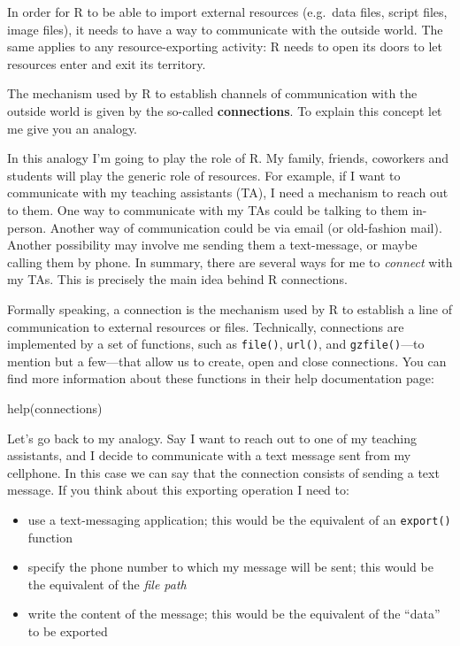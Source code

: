 \documentclass[
]{book}
\newenvironment{Shaded}{\begin{snugshade}}{\end{snugshade}}
\newcommand{\FunctionTok}[1]{\textcolor[rgb]{0.00,0.00,0.00}{#1}}
\newcommand{\NormalTok}[1]{#1}
\begin{document}
In order for R to be able to import external resources (e.g.~data files,
script files, image files), it needs to have a way to communicate with the
outside world. The same applies to any resource-exporting activity: R
needs to open its doors to let resources enter and exit its territory.

The mechanism used by R to establish channels of communication with the
outside world is given by the so-called \textbf{connections}. To explain this
concept let me give you an analogy.

In this analogy I'm going to play the role of R. My family, friends, coworkers
and students will play the generic role of resources. For example, if I want to
communicate with my teaching assistants (TA), I need a mechanism to reach
out to them. One way to communicate with my TAs could be talking to them in-person.
Another way of communication could be via email (or old-fashion mail). Another
possibility may involve me sending them a text-message, or maybe calling them
by phone. In summary, there are several ways for me to \emph{connect} with my TAs.
This is precisely the main idea behind R connections.

Formally speaking, a connection is the mechanism used by R to establish a line
of communication to external resources or files. Technically, connections
are implemented by a set of functions, such as \texttt{file()}, \texttt{url()}, and
\texttt{gzfile()}---to mention but a few---that allow us to create, open and close
connections. You can find more information about these functions in their help
documentation page:

\begin{Shaded}
\begin{Highlighting}[]
\FunctionTok{help}\NormalTok{(connections)}
\end{Highlighting}
\end{Shaded}

Let's go back to my analogy. Say I want to reach out to one of my teaching
assistants, and I decide to communicate with a text message sent from my
cellphone. In this case we can say that the connection consists of sending a
text message. If you think about this exporting operation I need to:

\begin{itemize}
\item
  use a text-messaging application; this would be the equivalent of an
  \texttt{export()} function
\item
  specify the phone number to which my message will be sent; this would be the
  equivalent of the \emph{file path}
\item
  write the content of the message; this would be the equivalent of the ``data''
  to be exported
\end{itemize}
\end{document}
